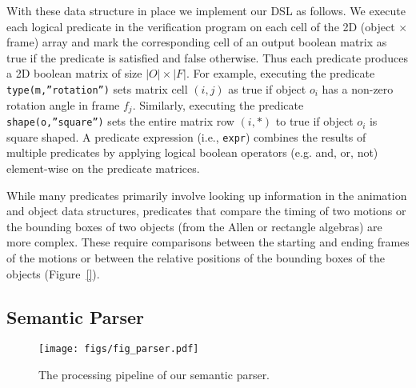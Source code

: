 With these data structure in place we implement our DSL as follows.
%
%
We execute each logical predicate in the verification program on each
cell of the 2D (object $\times$ frame) array and mark the
corresponding cell of an output boolean matrix as true if the
predicate is satisfied and false otherwise. Thus each predicate
produces a 2D boolean matrix of size $|O| \times |F|$.
%
For example, executing the predicate {\tt type(m,''rotation'')} sets
matrix cell $(i,j)$ as true if object $o_i$ has a non-zero rotation
angle in frame $f_j$. Similarly, executing the predicate {\tt
  shape(o,''square'')} sets the entire matrix row $(i,*)$ to true if
object $o_i$ is square shaped. 
%
A predicate expression (i.e., {\tt expr}) combines the results of
multiple predicates by applying logical boolean operators (e.g. and,
or, not) element-wise on the predicate matrices.
%

While many predicates primarily involve looking up information in the
animation and object data structures, predicates that compare the
timing of two motions or the bounding boxes of two objects (from the
Allen or rectangle algebras) are more complex. These require
comparisons between the starting and ending frames of the motions or
between the relative positions of the bounding boxes of the objects
(Figure~\ref{}).







\subsection{Semantic Parser}
\label{sec:parsers}

\begin{figure*}[t]
    \centering
    \texttt{[image: figs/fig\_parser.pdf]}
    \caption{
        The processing pipeline of our semantic parser. 
    }
    \label{fig:parser}
\end{figure*}
    

